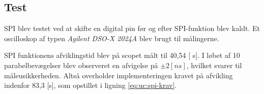 \subsection{Test} 
%
%
%
%
%
%
SPI blev testet ved at skifte en digital pin før og efter SPI-funktion blev kaldt.
Et oscilloskop af typen \textit{Agilent DSO-X 2024A} blev brugt til målingerne. 

SPI funktionens afviklingstid blev på scopet målt til 40,54 [ \micro s].
I løbet af 10 parabelbevægelser blev observeret en afvigelse på $\pm 2 [ ns]$, hvilket svarer til måleusikkerheden. 
Altså overholder implementeringen kravet på afvikling indenfor 83,3 [\micro s], som opstillet i ligning \ref{eq:uc:spi-krav}.


